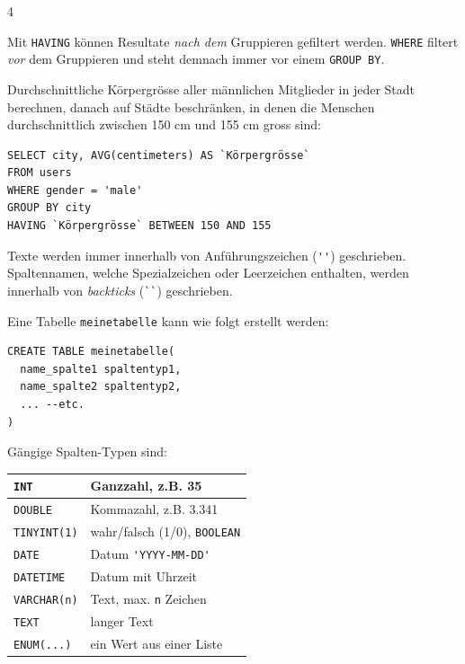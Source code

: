 \begin{landscape}
\begin{multicols*}{4}
\begin{cheatSheetBox}[title=Filtern \textit{nach} Gruppieren: \texorpdfstring{\lstinline|HAVING|}{HAVING}]
Mit \lstinline|HAVING| können Resultate \textit{nach dem} Gruppieren gefiltert werden. \lstinline|WHERE| filtert \textit{vor} dem Gruppieren und steht demnach immer vor einem \lstinline|GROUP BY|.

Durchschnittliche Körpergrösse aller männlichen Mitglieder in jeder Stadt berechnen, danach auf Städte beschränken, in denen die Menschen durchschnittlich zwischen 150 cm und 155 cm gross sind:

\begin{lstlisting}
SELECT city, AVG(centimeters) AS `Körpergrösse`
FROM users
WHERE gender = 'male'
GROUP BY city
HAVING `Körpergrösse` BETWEEN 150 AND 155
\end{lstlisting}
\end{cheatSheetBox}
Texte werden immer innerhalb von Anführungszeichen (\lstinline|''|) geschrieben. Spaltennamen, welche Spezialzeichen oder Leerzeichen enthalten, werden innerhalb von \textit{backticks} (\lstinline|``|) geschrieben.

\clearpage
\begin{cheatSheetBox}[title=Tabellen erstellen: \texorpdfstring{\lstinline|CREATE TABLE|}{CREATE TABLE}]
Eine Tabelle \texttt{meinetabelle} kann wie folgt erstellt werden:
\begin{lstlisting}
CREATE TABLE meinetabelle(
  name_spalte1 spaltentyp1,
  name_spalte2 spaltentyp2,
  ... --etc.
)
\end{lstlisting}
Gängige Spalten-Typen sind:
\begin{table}[H]
\tiny
\centering
\begin{tabular}{l|p{.62\linewidth}}
\lstinline|INT|&Ganzzahl, z.B. 35\\\midrule
\lstinline|DOUBLE| & Kommazahl, z.B. 3.341\\\midrule
\lstinline|TINYINT(1)|& wahr/falsch (1/0), \lstinline|BOOLEAN|\\\midrule
\lstinline|DATE|&Datum \lstinline|'YYYY-MM-DD'|\\\midrule
\lstinline|DATETIME|&Datum mit Uhrzeit\\\midrule
\lstinline|VARCHAR(n)|&Text, max. \texttt{n} Zeichen\\\midrule
\lstinline|TEXT|&langer Text\\\midrule
\lstinline|ENUM(...)|&ein Wert aus einer Liste\\
\end{tabular}
\end{table}
\end{cheatSheetBox}


\end{multicols*}
\end{landscape}
